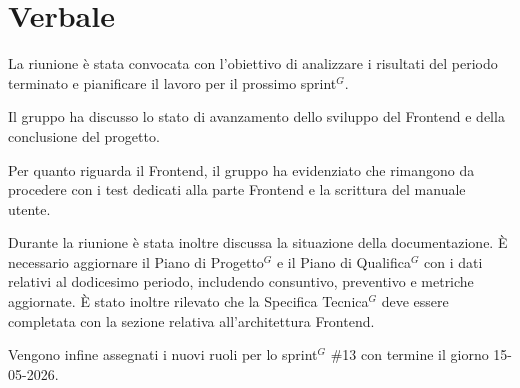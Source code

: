 \documentclass[a4paper,10pt]{article}
\begin{document}
\section*{Verbale}

La riunione è stata convocata con l'obiettivo di analizzare i risultati del periodo terminato e pianificare il lavoro per il prossimo sprint$^G$.

Il gruppo ha discusso lo stato di avanzamento dello sviluppo del Frontend e della conclusione del progetto.

Per quanto riguarda il Frontend, il gruppo ha evidenziato che rimangono da procedere con i test dedicati alla parte Frontend e la scrittura del manuale utente.

Durante la riunione è stata inoltre discussa la situazione della documentazione. È necessario aggiornare il Piano di Progetto$^G$ e il Piano di Qualifica$^G$ con i dati relativi al dodicesimo periodo, includendo consuntivo, preventivo e metriche aggiornate. È stato inoltre rilevato che la Specifica Tecnica$^G$ deve essere completata con la sezione relativa all'architettura Frontend.

Vengono infine assegnati i nuovi ruoli per lo sprint$^G$ \#13 con termine il giorno 15-05-2026.
\end{document}
